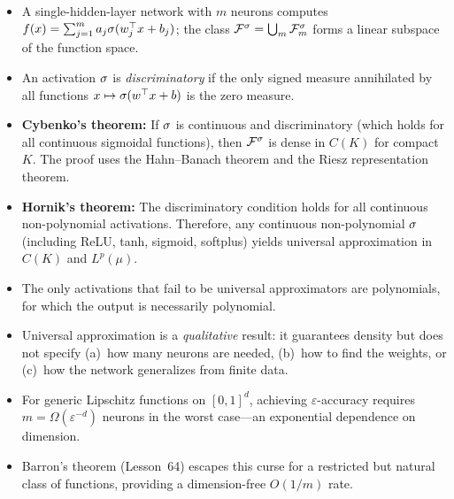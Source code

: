 \documentclass[11pt,a4paper]{article}
\begin{document}
\begin{itemize}
  \item A single-hidden-layer network with $m$ neurons computes
    $f(x) = \sum_{j=1}^m a_j \sigma(w_j^\top x + b_j)$; the class
    $\mathcal{F}^{\sigma} = \bigcup_m \mathcal{F}_m^{\sigma}$ forms a
    linear subspace of the function space.

  \item An activation $\sigma$ is \emph{discriminatory} if the only
    signed measure annihilated by all functions $x \mapsto
    \sigma(w^\top x + b)$ is the zero measure.

  \item \textbf{Cybenko's theorem:} If $\sigma$ is continuous and
    discriminatory (which holds for all continuous sigmoidal functions),
    then $\mathcal{F}^{\sigma}$ is dense in $C(K)$ for compact $K$.  The
    proof uses the Hahn--Banach theorem and the Riesz representation
    theorem.

  \item \textbf{Hornik's theorem:} The discriminatory condition holds for
    all continuous non-polynomial activations.  Therefore, any continuous
    non-polynomial $\sigma$ (including ReLU, tanh, sigmoid, softplus)
    yields universal approximation in $C(K)$ and $L^p(\mu)$.

  \item The only activations that fail to be universal approximators are
    polynomials, for which the output is necessarily polynomial.

  \item Universal approximation is a \emph{qualitative} result: it
    guarantees density but does not specify (a)~how many neurons are
    needed, (b)~how to find the weights, or (c)~how the network
    generalizes from finite data.

  \item For generic Lipschitz functions on $[0,1]^d$, achieving
    $\varepsilon$-accuracy requires $m = \Omega(\varepsilon^{-d})$
    neurons in the worst case---an exponential dependence on dimension.

  \item Barron's theorem (Lesson~64) escapes this curse for a restricted
    but natural class of functions, providing a dimension-free
    $O(1/m)$ rate.
\end{itemize}

\end{document}
